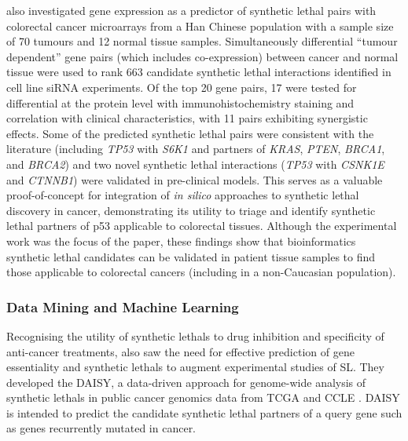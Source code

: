\citet{Tiong2014} also investigated \gls{gene expression} as a predictor of \gls{synthetic lethal} pairs with colorectal cancer \glspl{microarray} from a Han Chinese population with a sample size of 70 tumours and 12 normal tissue samples. Simultaneously differential  ``tumour dependent'' gene pairs (which includes co-expression) between cancer and normal tissue were used to rank 663 candidate \gls{synthetic lethal} interactions identified in cell line \gls{siRNA} experiments. Of the top 20 gene pairs, 17 were tested for differential  at the protein level with immunohistochemistry staining and correlation with clinical characteristics, with 11 pairs exhibiting synergistic effects. Some of the predicted \gls{synthetic lethal} pairs were consistent with the literature (including \textit{TP53} with \textit{S6K1} and partners of \textit{KRAS},  \textit{PTEN}, \textit{BRCA1}, and \textit{BRCA2}) and two novel \gls{synthetic lethal} interactions (\textit{TP53} with \textit{CSNK1E} and \textit{CTNNB1}) were validated in pre-clinical models. This serves as a valuable proof-of-concept for integration of \textit{in silico} approaches to \gls{synthetic lethal} discovery in cancer, demonstrating its utility to triage and identify \gls{synthetic lethal} partners of p53 applicable to colorectal tissues. Although the experimental work was the focus of the paper, these findings show that \gls{bioinformatics} \gls{synthetic lethal} candidates can be validated in patient tissue samples to find those applicable to colorectal cancers (including in a non-Caucasian population).

\subsubsection{Data Mining and Machine Learning}


Recognising the utility of \glspl{synthetic lethal} to drug inhibition and specificity of anti-cancer \glspl{treatment}, \citet{Jerby2014} also saw the need for effective prediction of gene essentiality and \glspl{synthetic lethal} to augment experimental studies of SL. They developed the \gls{DAISY}, a data-driven approach for \gls{genome}-wide analysis of \glspl{synthetic lethal} in public cancer \glspl{genomic} data from \gls{TCGA} and \gls{CCLE}  \citep{Barretina2012}. \gls{DAISY} is intended to predict the candidate \gls{synthetic lethal} partners of a query gene such as genes recurrently mutated in cancer.  

